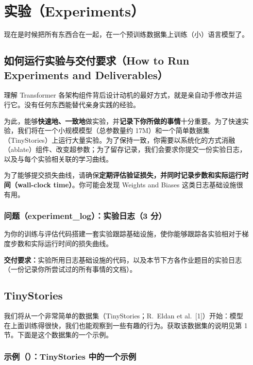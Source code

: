 \section{实验（Experiments）}

现在是时候把所有东西合在一起，在一个预训练数据集上训练（小）语言模型了。

\subsection{如何运行实验与交付要求（How to Run Experiments and Deliverables）}

理解 Transformer 各架构组件背后设计动机的最好方式，就是亲自动手修改并运行它。没有任何东西能替代亲身实践的经验。

为此，能够\textbf{快速地、一致地}做实验，并\textbf{记录下你所做的事情}十分重要。为了快速实验，我们将在一个小规模模型（总参数量约 17M）和一个简单数据集（TinyStories）上运行大量实验。为了保持一致，你需要以系统化的方式消融（ablate）组件、改变超参数；为了留存记录，我们会要求你提交一份实验日志，以及与每个实验相关联的学习曲线。

为了能够提交损失曲线，请确保\textbf{定期评估验证损失，并同时记录步数和实际运行时间（wall-clock time）}。你可能会发现 Weights and Biases 这类日志基础设施很有用。

\subsubsection*{问题（experiment\_log）：实验日志（3 分）}

为你的训练与评估代码搭建一套实验跟踪基础设施，使你能够跟踪各实验相对于梯度步数和实际运行时间的损失曲线。

\textbf{交付要求：}实验所用日志基础设施的代码，以及本节下方各作业题目的实验日志（一份记录你所尝试过的所有事情的文档）。

\subsection{TinyStories}

我们将从一个非常简单的数据集（TinyStories；R.~Eldan et al.~[1]）开始：模型在上面训练得很快，我们也能观察到一些有趣的行为。获取该数据集的说明见第 1 节。下面是这个数据集的一个示例。

\subsubsection*{示例（）：TinyStories 中的一个示例}

